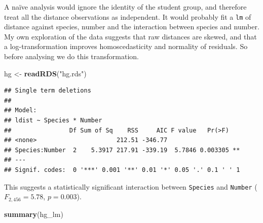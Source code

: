 \documentclass[]{book}
\newenvironment{Shaded}{\begin{snugshade}}{\end{snugshade}}
\newcommand{\KeywordTok}[1]{\textcolor[rgb]{0.13,0.29,0.53}{\textbf{#1}}}
\newcommand{\DataTypeTok}[1]{\textcolor[rgb]{0.13,0.29,0.53}{#1}}
\newcommand{\StringTok}[1]{\textcolor[rgb]{0.31,0.60,0.02}{#1}}
\newcommand{\OperatorTok}[1]{\textcolor[rgb]{0.81,0.36,0.00}{\textbf{#1}}}
\newcommand{\NormalTok}[1]{#1}
\theoremstyle{definition}
\theoremstyle{definition}
\theoremstyle{definition}
\theoremstyle{remark}
\begin{document}
A naïve analysis would ignore the identity of the student group, and
therefore treat all the distance observations as independent. It would
probably fit a \texttt{lm} of distance against species, number and the
interaction between species and number. My own exploration of the data
suggests that raw distances are skewed, and that a log-transformation
improves homoscedasticity and normality of residuals. So before
analysing we do this transformation.

\begin{Shaded}
\begin{Highlighting}[]
\NormalTok{hg <-}\StringTok{ }\KeywordTok{readRDS}\NormalTok{(}\StringTok{"hg.rds"}\NormalTok{)}
\end{Highlighting}
\end{Shaded}

\small

\begin{Shaded}
\end{Shaded}

\begin{verbatim}
## Single term deletions
## 
## Model:
## ldist ~ Species * Number
##                Df Sum of Sq    RSS     AIC F value   Pr(>F)   
## <none>                      212.51 -346.77                    
## Species:Number  2    5.3917 217.91 -339.19  5.7846 0.003305 **
## ---
## Signif. codes:  0 '***' 0.001 '**' 0.01 '*' 0.05 '.' 0.1 ' ' 1
\end{verbatim}

\normalsize

This suggests a statistically significant interaction between
\texttt{Species} and \texttt{Number} (\(F_{2, 456} = 5.78\),
\(p = 0.003\)).

\small

\begin{Shaded}
\begin{Highlighting}[]
\KeywordTok{summary}\NormalTok{(hg_lm)}
\end{Highlighting}
\end{Shaded}
\end{document}
